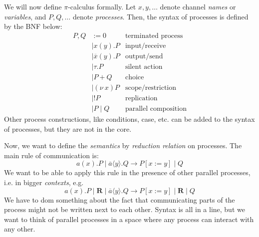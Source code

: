 \documentclass[a4paper, openany]{memoir}
\theoremstyle{definition}
\begin{document}
    We will now define $\pi$-calculus formally. Let $x, y, \dots$ denote channel \emph{names} or \emph{variables}, and $P, Q, \dots$ denote \emph{processes}. Then, the syntax of processes is defined by the BNF below:
    \begin{align*}
        P, Q &:= 0 & \textrm{terminated process} \\
        &\mid x(y).P & \textrm{input/receive} \\
        &\mid \overline{x}(y).P & \textrm{output/send} \\
        &\mid \tau.P & \textrm{silent action} \\
        &\mid P + Q & \textrm{choice} \\
        &\mid (\nu \ x) P & \textrm{scope/restriction} \\
        &\mid !P & \textrm{replication} \\
        &\mid P \mid Q & \textrm{parallel composition}
    \end{align*}
    Other process constructions, like conditions, case, etc. can be added to the syntax of processes, but they are not in the core.

    Now, we want to define the \emph{semantics} by \emph{reduction relation} on processes. The main rule of communication is:
    \[a(x).P \mid \overline{a} \langle y \rangle.Q \to P[x := y] \mid Q\]
    We want to be able to apply this rule in the presence of other parallel processes, i.e. in bigger \emph{contexts}, e.g.
    \[a(x).P \mid \textbf{R} \mid \overline{a} \langle y \rangle.Q \to P[x := y] \mid \textbf{R} \mid Q\]
    We have to dom something about the fact that communicating parts of the process might not be written next to each other. Syntax is all in a line, but we want to think of parallel processes in a space where any process can interact with any other.
\end{document}
